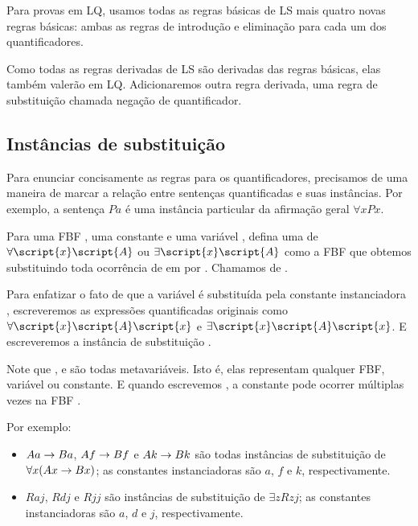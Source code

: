 Para provas em LQ, usamos todas as regras básicas de LS mais quatro novas regras básicas: ambas as regras de introdução e eliminação para cada um dos quantificadores.

Como todas as regras derivadas de LS são derivadas das regras básicas, elas também valerão em LQ. Adicionaremos outra regra derivada, uma regra de substituição chamada negação de quantificador.

\subsection{Instâncias de substituição}

Para enunciar concisamente as regras para os quantificadores, precisamos de uma maneira de marcar a relação entre sentenças quantificadas e suas instâncias. Por exemplo, a sentença $Pa$ é uma instância particular da afirmação geral $\forall x Px$.

Para uma FBF , uma constante  e uma variável , defina uma  de $\forall \script{x}\script{A}$ ou $\exists \script{x}\script{A}$ como a FBF que obtemos substituindo toda ocorrência de  em  por . Chamamos  de .

Para enfatizar o fato de que a variável  é substituída pela constante instanciadora , escreveremos as expressões quantificadas originais como $\forall \script{x}\script{A}\script{x}$ e $\exists \script{x}\script{A}\script{x}$. E escreveremos a instância de substituição .

Note que ,  e  são todas metavariáveis. Isto é, elas representam qualquer FBF, variável ou constante. E quando escrevemos , a constante  pode ocorrer múltiplas vezes na FBF .


Por exemplo:

\begin{itemize}
\item $Aa \rightarrow Ba$, $Af \rightarrow Bf$ e $Ak \rightarrow Bk$ são todas instâncias de substituição de $\forall x(Ax \rightarrow Bx)$; as constantes instanciadoras são $a$, $f$ e $k$, respectivamente.
\item $Raj$, $Rdj$ e $Rjj$ são instâncias de substituição de $\exists zRzj$; as constantes instanciadoras são $a$, $d$ e $j$, respectivamente.
\end{itemize}

